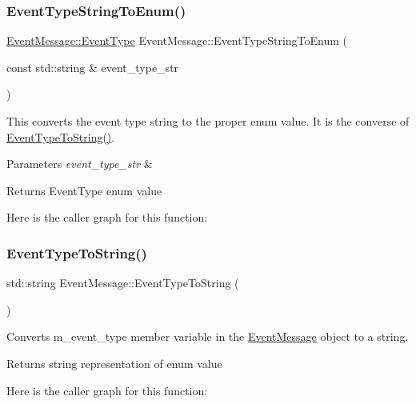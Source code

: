 \subsubsection{\texorpdfstring{Event\+Type\+String\+To\+Enum()}{EventTypeStringToEnum()}}
{\footnotesize\ttfamily \mbox{\hyperlink{classEventMessage_a262da559aa416f176fdda72e8b5113ab}{Event\+Message\+::\+Event\+Type}} Event\+Message\+::\+Event\+Type\+String\+To\+Enum (\begin{DoxyParamCaption}\item[{const std\+::string \&}]{event\+\_\+type\+\_\+str }\end{DoxyParamCaption})\hspace{0.3cm}{\ttfamily [private]}}



This converts the event type string to the proper enum value. It is the converse of \mbox{\hyperlink{classEventMessage_a3dd4a7325fcc39e7cfdf2365422ae1c7}{Event\+Type\+To\+String()}}. 


\begin{DoxyParams}{Parameters}
{\em event\+\_\+type\+\_\+str} & \\
\hline
\end{DoxyParams}
\begin{DoxyReturn}{Returns}
Event\+Type enum value 
\end{DoxyReturn}
Here is the caller graph for this function\+:
\mbox{\label{classEventMessage_a3dd4a7325fcc39e7cfdf2365422ae1c7}} 
\subsubsection{\texorpdfstring{Event\+Type\+To\+String()}{EventTypeToString()}\hspace{0.1cm}{\footnotesize\ttfamily [1/2]}}
{\footnotesize\ttfamily std\+::string Event\+Message\+::\+Event\+Type\+To\+String (\begin{DoxyParamCaption}{ }\end{DoxyParamCaption})}



Converts m\+\_\+event\+\_\+type member variable in the \mbox{\hyperlink{classEventMessage}{Event\+Message}} object to a string. 

\begin{DoxyReturn}{Returns}
string representation of enum value 
\end{DoxyReturn}
Here is the caller graph for this function\+:
\mbox{\label{classEventMessage_ac6ffbdd947ed15375d4882003626b33e}} 
